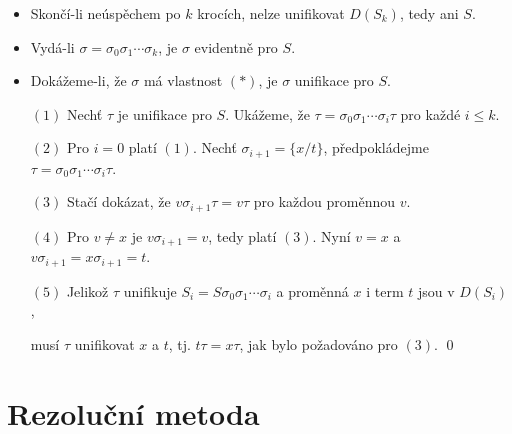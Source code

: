    \begin{itemize}
    \item Skončí-li neúspěchem po $k$ krocích, nelze unifikovat $D(S_k)$, tedy ani $S$.
    \vspace{0.5mm}
    
    \item Vydá-li $\sigma=\sigma_0\sigma_1\cdots\sigma_k$, je $\sigma$ evidentně  pro $S$.
    \vspace{0.5mm}
    
    \item Dokážeme-li, že $\sigma$ má vlastnost $(*)$, je $\sigma$  unifikace pro $S$.
    \vspace{0.5mm}
    
    \item[$(1)$] Nechť $\tau$ je unifikace pro $S$. Ukážeme, že $\tau=\sigma_0\sigma_1\cdots\sigma_i\tau$ pro každé $i\le k$.
    \vspace{0.5mm}
    
    \item[$(2)$] Pro $i=0$ platí $(1)$. Nechť $\sigma_{i+1}=\{x/t\}$, předpokládejme $\tau=\sigma_0\sigma_1\cdots\sigma_i\tau$.
    \vspace{0.5mm}
    
    \item[$(3)$] Stačí dokázat, že $v\sigma_{i+1}\tau=v\tau$ pro každou proměnnou $v$.
    \vspace{0.5mm}
    
    \item[$(4)$] Pro $v\ne x$ je $v\sigma_{i+1}=v$, tedy platí $(3)$. Nyní $v=x$ a $v\sigma_{i+1}=x\sigma_{i+1}=t$.
    \vspace{0.5mm}
    
    \item[$(5)$] Jelikož $\tau$ unifikuje $S_{i}=S\sigma_0\sigma_1\cdots\sigma_i$ a proměnná $x$ i term $t$ jsou v $D(S_{i})$,
    \vspace{0.5mm}
    
    musí $\tau$ unifikovat $x$ a $t$, tj. $t\tau=x\tau$, jak bylo požadováno pro $(3)$. \qed
    \end{itemize}
    
    

\section{Rezoluční metoda}\label{section:predicate-resolution-method}
\todo

